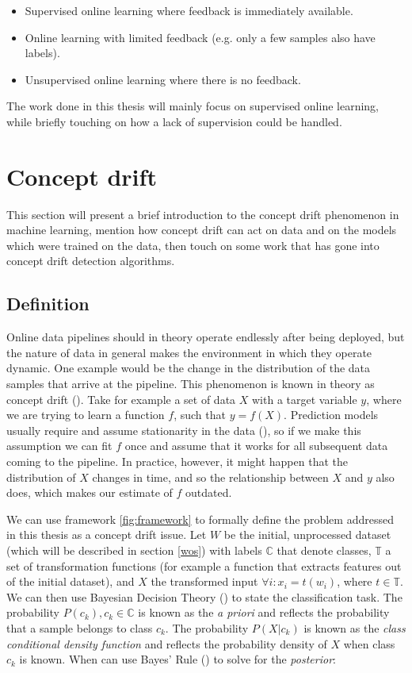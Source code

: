 \documentclass[12pt]{extreport}
\begin{document}
\begin{itemize}
    \item Supervised online learning where feedback is immediately available.
    \item Online learning with limited feedback (e.g. only a few samples also have labels).
    \item Unsupervised online learning where there is no feedback.
\end{itemize}

The work done in this thesis will mainly focus on supervised online learning, while briefly touching on how a lack of supervision could be handled.

\section{Concept drift} \label{concept-drift}

This section will present a brief introduction to the concept drift phenomenon in machine learning, mention how concept drift can act on data and on the models which were trained on the data, then touch on some work that has gone into concept drift detection algorithms.

\subsection{Definition}

Online data pipelines should in theory operate endlessly after being deployed, but the nature of data in general makes the environment in which they operate dynamic. One example would be the change in the distribution of the data samples that arrive at the pipeline. This phenomenon is known in theory as concept drift (\cite{survey-concept-drift}). Take for example a set of data $X$ with a target variable $y$, where we are trying to learn a function $f$, such that $y = f(X)$. Prediction models usually require and assume stationarity in the data (\cite{Heng_Wang_2015}), so if we make this assumption we can fit $f$ once and assume that it works for all subsequent data coming to the pipeline. In practice, however, it might happen that the distribution of $X$ changes in time, and so the relationship between $X$ and $y$ also does, which makes our estimate of $f$ outdated.

We can use framework \ref{fig:framework} to formally define the problem addressed in this thesis as a concept drift issue. Let $W$ be the initial, unprocessed dataset (which will be described in section \ref{wos}) with labels $\mathbb{C}$ that denote classes, $\mathbb{T}$ a set of transformation functions (for example a function that extracts features out of the initial dataset), and $X$ the transformed input $\forall i: x_i = t(w_i)$, where $t \in \mathbb{T}$. We can then use Bayesian Decision Theory (\cite{pattern-classification}) to state the classification task. The probability $P(c_k), c_k \in \mathbb{C}$ is known as the \emph{a priori} and reflects the probability that a sample belongs to class $c_k$. The probability $P(X|c_k)$ is known as the \emph{class conditional density function} and reflects the probability density of $X$ when class $c_k$ is known. When can use Bayes' Rule (\cite{bayesrule}) to solve for the \emph{posterior}:
\end{document}
